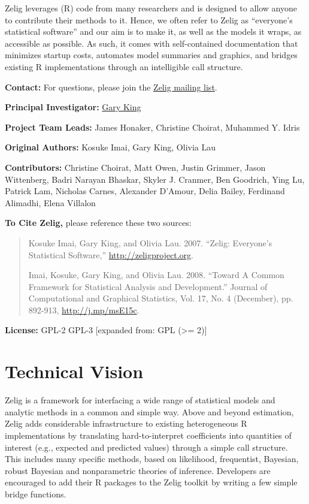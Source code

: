 \documentclass[letterpaper,10pt,english]{sphinxmanual}
\begin{document}
Zelig leverages (R) code from many researchers and is designed to allow anyone to contribute their methods to it. Hence, we often refer to Zelig as ``everyone's statistical software'' and our aim is to make it, as well as the models it wraps, as accessible as possible. As such, it comes with self-contained documentation that minimizes startup costs, automates model summaries and graphics, and bridges existing R implementations through an intelligible call structure.

\textbf{Contact:} For questions, please join the \href{https://groups.google.com/forum/\#!forum/zelig-statistical-software}{Zelig mailing list}.

\textbf{Principal Investigator:} \href{http://gking.harvard.edu/}{Gary King}

\textbf{Project Team Leads:} James Honaker, Christine Choirat, Muhammed Y. Idris

\textbf{Original Authors:} Kosuke Imai, Gary King, Olivia Lau

\textbf{Contributors:}  Christine Choirat, Matt Owen, Justin Grimmer, Jason Wittenberg, Badri Narayan Bhaskar, Skyler J. Cranmer, Ben Goodrich, Ying Lu, Patrick Lam, Nicholas Carnes, Alexander D'Amour, Delia Bailey, Ferdinand Alimadhi, Elena Villalon

\textbf{To Cite Zelig,} please reference these two sources:
\begin{quote}

Kosuke Imai, Gary King, and Olivia Lau. 2007. ``Zelig: Everyone's Statistical Software,''  \href{http://zeligproject.org}{http://zeligproject.org}.

Imai, Kosuke, Gary King, and Olivia Lau. 2008. ``Toward A Common Framework for Statistical Analysis and Development.'' Journal of Computational and Graphical Statistics, Vol. 17, No. 4 (December), pp. 892-913, \href{http://j.mp/msE15c}{http://j.mp/msE15c}.
\end{quote}

\textbf{License:} GPL-2 \textbar{} GPL-3 {[}expanded from: GPL (\textgreater{}= 2){]}


\section{Technical Vision}
\label{about:technical-vision}
Zelig is a framework for interfacing a wide range of statistical models and analytic methods in a common and simple way. Above and beyond estimation, Zelig adds considerable infrastructure to existing heterogeneous R implementations by translating hard-to-interpret coefficients into quantities of interest (e.g., expected and predicted values) through a simple call structure. This includes many specific methods, based on likelihood, frequentist, Bayesian, robust Bayesian and nonparametric theories of inference. Developers are encouraged to add their R packages to the Zelig toolkit by writing a few simple bridge functions.
\end{document}
